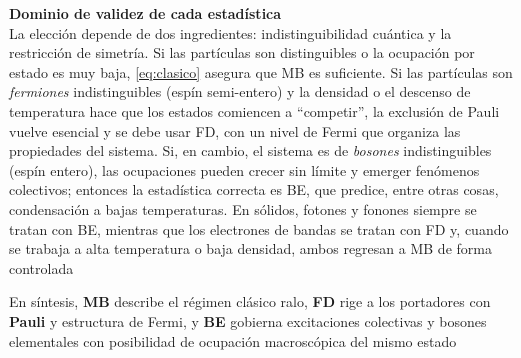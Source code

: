 \documentclass{article}
\begin{document}
\noindent\textcolor{Cerulean}{\textbf{Dominio de validez de cada estadística}} \\
La elección depende de dos ingredientes: indistinguibilidad cuántica y la restricción de simetría. Si las partículas son distinguibles o la ocupación por estado es muy baja, \eqref{eq:clasico} asegura que MB es suficiente. Si las partículas son \textit{fermiones} indistinguibles (espín semi-entero) y la densidad o el descenso de temperatura hace que los estados comiencen a “competir”, la exclusión de Pauli vuelve esencial y se debe usar FD, con un nivel de Fermi que organiza las propiedades del sistema. Si, en cambio, el sistema es de \textit{bosones} indistinguibles (espín entero), las ocupaciones pueden crecer sin límite y emerger fenómenos colectivos; entonces la estadística correcta es BE, que predice, entre otras cosas, condensación a bajas temperaturas. En sólidos, fotones y fonones siempre se tratan con BE, mientras que los electrones de bandas se tratan con FD y, cuando se trabaja a alta temperatura o baja densidad, ambos regresan a MB de forma controlada

\medskip

En síntesis, \textcolor{Cerulean}{\textbf{MB}} describe el régimen clásico ralo, \textcolor{Cerulean}{\textbf{FD}} rige a los portadores con \textbf{Pauli} y estructura de Fermi, y \textcolor{Cerulean}{\textbf{BE}} gobierna excitaciones colectivas y bosones elementales con posibilidad de ocupación macroscópica del mismo estado
\end{document}
